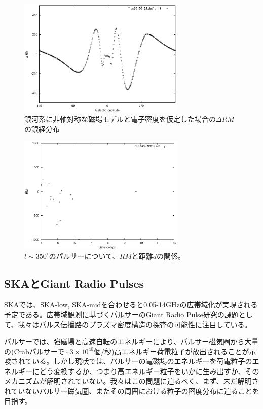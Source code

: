 \begin{figure}[htb]
\centering
\includegraphics[width=8cm,clip]{pulsar/BSS-drml.eps}
\caption{銀河系に非軸対称な磁場モデルと電子密度を仮定した場合の$\Delta RM$の銀経分布}
\label{bssdrml}
\end{figure}

\begin{figure}[htb]
\centering
\includegraphics[width=8cm,clip]{pulsar/UPl350.eps}
\caption{$l \sim 350^{\circ}$のパルサーについて、$RM$と距離$d$の関係。}
\label{UPl350}
\end{figure}



\subsection{SKAとGiant Radio Pulses}

SKAでは、SKA-low, SKA-midを合わせると0.05-14GHzの広帯域化が実現される予定である。広帯域観測に基づくパルサーのGiant Radio Pulse研究の課題として、我々はパルス伝播路のプラズマ密度構造の探査の可能性に注目している。

パルサーでは、強磁場と高速自転のエネルギーにより、パルサー磁気圏から大量の(Crabパルサーで$\sim3\times10^{40}$個/秒)高エネルギー荷電粒子が放出されることが示唆されている。しかし現状では、パルサーの電磁場のエネルギーを荷電粒子のエネルギーにどう変換するか、つまり高エネルギー粒子をいかに生み出すか、そのメカニズムが解明されていない。我々はこの問題に迫るべく、まず、未だ解明されていないパルサー磁気圏、またその周囲における粒子の密度分布に迫ることを目指す。

